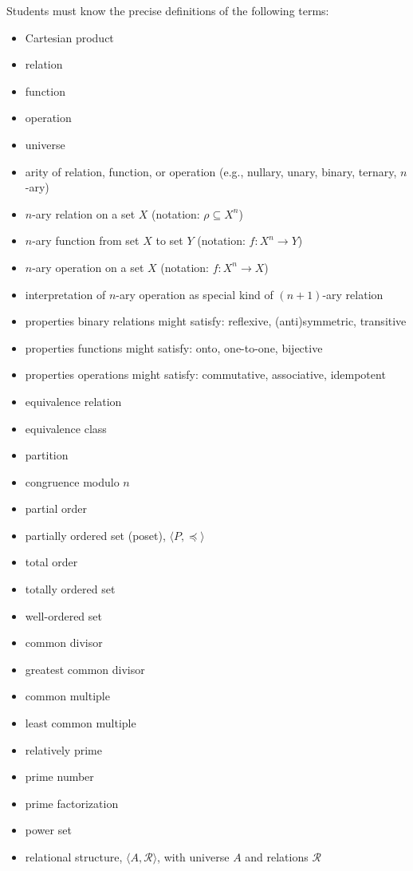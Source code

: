 \documentclass[12pt]{article}
\newcommand{\boldemph}[1]{#1}
\newcommand\<{\ensuremath{\langle}}
\renewcommand\>{\ensuremath{\rangle}}
\begin{document}
Students must know the precise definitions of the following terms:
\begin{itemize}
\item Cartesian product
\item relation
\item function
\item operation
\item universe
\item arity of relation, function, or operation (e.g., nullary, unary, binary, ternary, $n$-ary)
\item $n$-ary relation on a set $X$ (notation: $\rho \subseteq X^n$)
\item $n$-ary function from set $X$ to set $Y$ (notation: $f: X^n \rightarrow Y$)
\item $n$-ary operation on a set $X$ (notation: $f: X^n \rightarrow X$)
\item interpretation of $n$-ary operation as special kind of $(n+1)$-ary relation
\item properties binary relations might satisfy: \boldemph{reflexive},
  \boldemph{(anti)symmetric}, \boldemph{transitive}
\item properties functions might satisfy: onto, one-to-one, bijective
\item properties operations might satisfy: commutative, associative, idempotent
\item equivalence relation
\item equivalence class
\item partition
\item congruence modulo $n$
\item partial order
\item partially ordered set (poset), $\<P, \preceq\>$
\item total order
\item totally ordered set
\item well-ordered set
\item common divisor
\item greatest common divisor
\item common multiple
\item least common multiple
\item relatively prime
\item prime number
\item prime factorization
\item power set
\item relational structure, $\<A, \mathcal{R}\>$, with universe $A$ and relations $\mathcal{R}$ 

\end{itemize}
\end{document}
